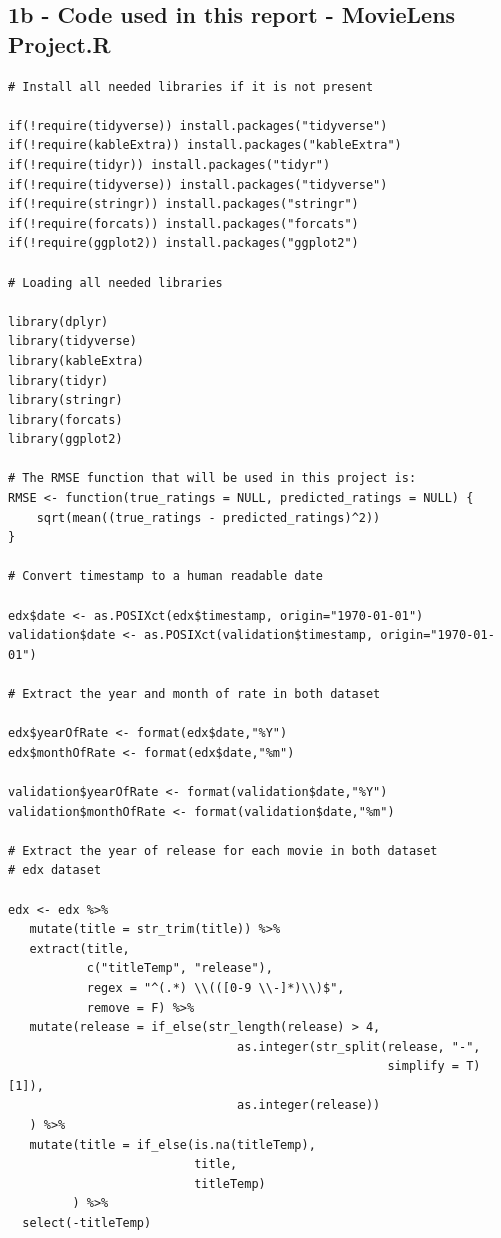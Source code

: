 \documentclass[]{article}
\begin{document}
\hypertarget{b---code-used-in-this-report---movielens-project.r}{%
\subsection{1b - Code used in this report - MovieLens
Project.R}\label{b---code-used-in-this-report---movielens-project.r}}

\begin{verbatim}
# Install all needed libraries if it is not present

if(!require(tidyverse)) install.packages("tidyverse") 
if(!require(kableExtra)) install.packages("kableExtra")
if(!require(tidyr)) install.packages("tidyr")
if(!require(tidyverse)) install.packages("tidyverse")
if(!require(stringr)) install.packages("stringr")
if(!require(forcats)) install.packages("forcats")
if(!require(ggplot2)) install.packages("ggplot2")

# Loading all needed libraries

library(dplyr)
library(tidyverse)
library(kableExtra)
library(tidyr)
library(stringr)
library(forcats)
library(ggplot2)

# The RMSE function that will be used in this project is:
RMSE <- function(true_ratings = NULL, predicted_ratings = NULL) {
    sqrt(mean((true_ratings - predicted_ratings)^2))
}

# Convert timestamp to a human readable date

edx$date <- as.POSIXct(edx$timestamp, origin="1970-01-01")
validation$date <- as.POSIXct(validation$timestamp, origin="1970-01-01")

# Extract the year and month of rate in both dataset

edx$yearOfRate <- format(edx$date,"%Y")
edx$monthOfRate <- format(edx$date,"%m")

validation$yearOfRate <- format(validation$date,"%Y")
validation$monthOfRate <- format(validation$date,"%m")

# Extract the year of release for each movie in both dataset
# edx dataset

edx <- edx %>%
   mutate(title = str_trim(title)) %>%
   extract(title,
           c("titleTemp", "release"),
           regex = "^(.*) \\(([0-9 \\-]*)\\)$",
           remove = F) %>%
   mutate(release = if_else(str_length(release) > 4,
                                as.integer(str_split(release, "-",
                                                     simplify = T)[1]),
                                as.integer(release))
   ) %>%
   mutate(title = if_else(is.na(titleTemp),
                          title,
                          titleTemp)
         ) %>%
  select(-titleTemp)


\end{verbatim}
\end{document}
